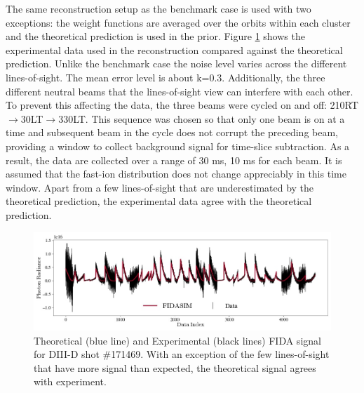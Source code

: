 The same reconstruction setup as the benchmark case is used with two exceptions: the weight functions are averaged over the orbits within each cluster and the theoretical prediction is used in the prior. 
Figure \ref{fig:d3d_data} shows the experimental data used in the reconstruction compared against the theoretical prediction. Unlike the benchmark case the noise level varies across the different lines-of-sight. The mean error level is about k=0.3. Additionally, the three different neutral beams that the lines-of-sight view can interfere with each other. To prevent this affecting the data, the three beams were cycled on and off: 210RT$\rightarrow$30LT$\rightarrow$330LT. This sequence was chosen so that only one beam is on at a time and subsequent beam in the cycle does not corrupt the preceding beam, providing a window to collect background signal for time-slice subtraction. As a result, the data are collected over a range of 30 ms, 10 ms for each beam. It is assumed that the fast-ion distribution does not change appreciably in this time window. Apart from a few lines-of-sight that are underestimated by the theoretical prediction, the experimental data agree with the theoretical prediction.
\begin{figure}[h!]
    \centering
    \includegraphics[width=16cm]{figures/d3d_data.jpg}
    \caption{Theoretical (blue line) and Experimental (black lines) FIDA signal for DIII-D shot \#171469. With an exception of the few lines-of-sight that have more signal than expected, the theoretical signal agrees with experiment.}
    \label{fig:d3d_data}
\end{figure}

